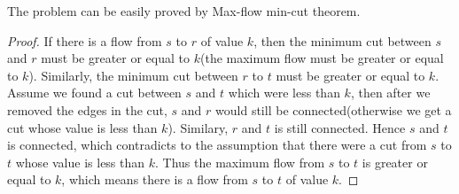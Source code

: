 The problem can be easily proved by Max-flow min-cut theorem.
\begin{proof}
  If there is a flow from $s$ to $r$ of value $k$, then the minimum cut between $s$ and $r$ must be greater or equal to $k$(the maximum flow must be greater or equal to $k$). Similarly, the minimum cut between $r$ to $t$ must be greater or equal to $k$. Assume we found a cut between $s$ and $t$ which were less than $k$, then after we removed the edges in the cut, $s$ and $r$ would still be connected(otherwise we get a cut whose value is less than $k$). Similary, $r$ and $t$ is still connected. Hence $s$ and $t$ is connected, which contradicts to the assumption that there were a cut from $s$ to $t$ whose value is less than $k$. Thus the maximum flow from $s$ to $t$ is greater or equal to $k$, which means there is a flow from $s$ to $t$ of value $k$.
\end{proof}
